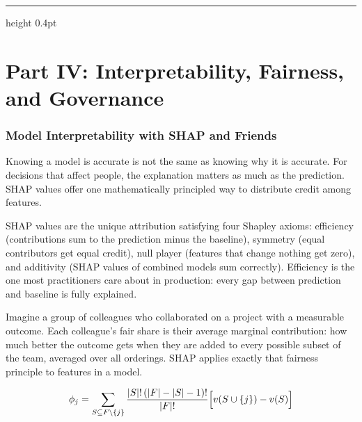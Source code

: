 \documentclass[12pt,a4paper]{article}
\begin{document}
\vspace{10pt}\hrule height 0.4pt\vspace{14pt}

\part*{Part IV: Interpretability, Fairness, and Governance}

\section*{Model Interpretability with SHAP and Friends}

Knowing a model is accurate is not the same as knowing why it is accurate.
For decisions that affect people, the explanation matters as much as the
prediction. SHAP values offer one mathematically principled way to
distribute credit among features.

\begin{concept}
SHAP values are the unique attribution satisfying four Shapley axioms:
efficiency (contributions sum to the prediction minus the baseline),
symmetry (equal contributors get equal credit), null player (features that
change nothing get zero), and additivity (SHAP values of combined models
sum correctly). Efficiency is the one most practitioners care about in
production: every gap between prediction and baseline is fully explained.
\end{concept}

\begin{analogy}
Imagine a group of colleagues who collaborated on a project with a
measurable outcome. Each colleague's fair share is their average marginal
contribution: how much better the outcome gets when they are added to every
possible subset of the team, averaged over all orderings. SHAP applies
exactly that fairness principle to features in a model.
\end{analogy}

\begin{equation*}
  \phi_j = \sum_{S \subseteq F\setminus\{j\}}
  \frac{|S|!\,(|F|-|S|-1)!}{|F|!}
  \Bigl[v(S\cup\{j\}) - v(S)\Bigr]
\end{equation*}
\end{document}
